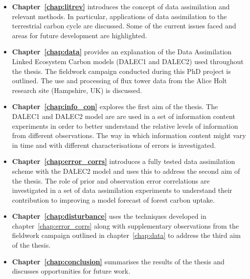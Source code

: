 \begin{itemize}
\item \textbf{Chapter~\ref{chap:litrev}} introduces the concept of data assimilation and relevant methods. In particular, applications of data assimilation to the terrestrial carbon cycle are discussed. Some of the current issues faced and areas for future development are highlighted.  

\item \textbf{Chapter~\ref{chap:data}} provides an explanation of the Data Assimilation Linked Ecosystem Carbon models (DALEC1 and DALEC2) used throughout the thesis. The fieldwork campaign conducted during this PhD project is outlined. The use and processing of flux tower data from the Alice Holt research site (Hampshire, UK) is discussed.

\item \textbf{Chapter~\ref{chap:info_con}} explores the first aim of the thesis. The DALEC1 and DALEC2 model are are used in a set of information content experiments in order to better understand the relative levels of information from different observations. The way in which information content might vary in time and with different characterisations of errors is investigated.

\item \textbf{Chapter~\ref{chap:error_corrs}} introduces a fully tested data assimilation scheme with the DALEC2 model and uses this to address the second aim of the thesis. The role of prior and observation error correlations are investigated in a set of data assimilation experiments to understand their contribution to improving a model forecast of forest carbon uptake.

\item \textbf{Chapter~\ref{chap:disturbance}} uses the techniques developed in chapter~\ref{chap:error_corrs} along with supplementary observations from the fieldwork campaign outlined in chapter~\ref{chap:data} to address the third aim of the thesis.

\item \textbf{Chapter~\ref{chap:conclusion}} summarises the results of the thesis and discusses opportunities for future work.    

\end{itemize}

